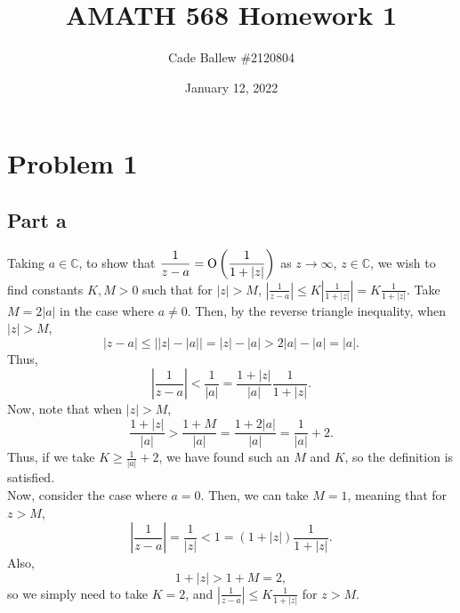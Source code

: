 \documentclass{article}
\title{AMATH 568 Homework 1}
\author{Cade Ballew \#2120804}
\date{January 12, 2022}
\begin{document}
\maketitle

\section{Problem 1}
\subsection{Part a}
Taking $a\in\mathbb{C}$, to show that $\displaystyle \frac{1}{z -a} = \operatorname{O}\left(\frac{1}{1 + |z|} \right)$ as $z \to \infty$, $z \in \mathbb C$, we wish to find constants $K,M>0$ such that for $|z|>M$, $\left|\frac{1}{z -a}\right|\leq K\left|\frac{1}{1 + |z|}\right|=K\frac{1}{1 + |z|}$. Take $M=2|a|$ in the case where $a\neq0$. Then, by the reverse triangle inequality, when $|z|>M$,
\[
|z-a|\leq\left||z|-|a|\right|=|z|-|a|>2|a|-|a|=|a|.
\]
Thus,
\[
\left|\frac{1}{z -a}\right|<\frac{1}{|a|}=\frac{1+|z|}{|a|}\frac{1}{1+|z|}.
\]
Now, note that when $|z|>M$,
\[
\frac{1+|z|}{|a|}>\frac{1+M}{|a|}=\frac{1+2|a|}{|a|}=\frac{1}{|a|}+2.
\]
Thus, if we take $K\geq\frac{1}{|a|}+2$, we have found such an $M$ and $K$, so the definition is satisfied.\\
Now, consider the case where $a=0$. Then, we can take $M=1$, meaning that for $z>M$, 
\[
\left|\frac{1}{z-a}\right|=\frac{1}{|z|}<1=(1+|z|)\frac{1}{1+|z|}.
\]
Also,
\[
1+|z|>1+M=2,
\]
so we simply need to take $K=2$, and $\left|\frac{1}{z -a}\right|\leq K\frac{1}{1 + |z|}$ for $z>M$.
\end{document}
